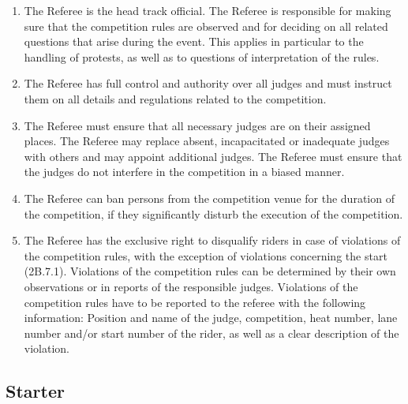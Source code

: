 \begin{enumerate}[leftmargin=1.5em,labelsep=*]
	\item The Referee is the head track official. The Referee is responsible for making sure 
    that the competition rules are observed and for deciding on all related questions 
    that arise during the event. This applies in particular to the handling of protests, 
    as well as to questions of interpretation of the rules.
	
	\item The Referee has full control and authority over all judges and 
	must instruct them on all details and regulations related to the competition.
	
	\item The Referee must ensure that all necessary judges are on their assigned places.
	The Referee may replace absent, incapacitated or inadequate judges with others and may appoint additional judges.
	The Referee must ensure that the judges do not interfere in the competition in a biased manner.
	
	\item The Referee can ban persons from the competition venue for the 
    duration of the competition, if they significantly disturb the execution of the competition.
	
	\item The Referee has the exclusive right to disqualify riders in case of violations of the 
    competition rules, with the exception of violations concerning the start (2B.7.1). 
    Violations of the competition rules can be determined by their own observations or in 
    reports of the responsible judges. Violations of the competition rules have to be reported to the 
    referee with the following information: Position and name of the judge, competition, heat number, 
    lane number and/or start number of the rider, as well as a clear description of the violation.
\end{enumerate}

\subsection{Starter \label{sec:track_starter}}

